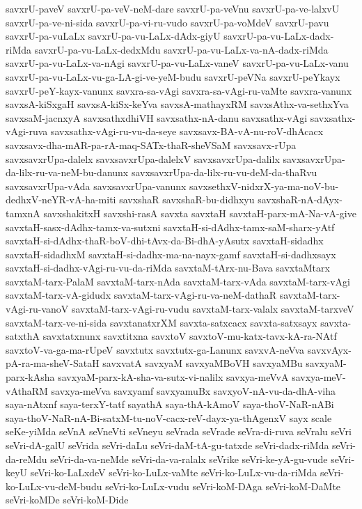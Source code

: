 {savxrU-paveV
savxrU-pa-veV-neM-dare
savxrU-pa-veVnu
savxrU-pa-ve-lalxvU
savxrU-pa-ve-ni-sida
savxrU-pa-vi-ru-vudo
savxrU-pa-voMdeV
savxrU-pavu
savxrU-pa-vuLaLx
savxrU-pa-vu-LaLx-dAdx-giyU
savxrU-pa-vu-LaLx-dadx-riMda
savxrU-pa-vu-LaLx-dedxMdu
savxrU-pa-vu-LaLx-va-nA-dadx-riMda
savxrU-pa-vu-LaLx-va-nAgi
savxrU-pa-vu-LaLx-vaneV
savxrU-pa-vu-LaLx-vanu
savxrU-pa-vu-LaLx-vu-ga-LA-gi-ve-yeM-budu
savxrU-peVNa
savxrU-peYkayx
savxrU-peY-kayx-vanunx
savxra-sa-vAgi
savxra-sa-vAgi-ru-vaMte
savxra-vanunx
savxsA-kiSxgaH
savxsA-kiSx-keYva
savxsA-mathayxRM
savxsAthx-va-sethxYva
savxsaM-jacnxyA
savxsathxdhiVH
savxsathx-nA-danu
savxsathx-vAgi
savxsathx-vAgi-ruva
savxsathx-vAgi-ru-vu-da-seye
savxsavx-BA-vA-nu-roV-dhAcacx
savxsavx-dha-mAR-pa-rA-maq-SATx-thaR-sheVSaM
savxsavx-rUpa
savxsavxrUpa-dalelx
savxsavxrUpa-dalelxV
savxsavxrUpa-dalilx
savxsavxrUpa-da-lilx-ru-va-neM-bu-danunx
savxsavxrUpa-da-lilx-ru-vu-deM-da-thaRvu
savxsavxrUpa-vAda
savxsavxrUpa-vanunx
savxsethxV-nidxrX-ya-ma-noV-bu-dedhxV-neYR-vA-ha-miti
savxshaR
savxshaR-bu-didhxyu
savxshaR-nA-dAyx-tamxnA
savxshakitxH
savxshi-rasA
savxta
savxtaH
savxtaH-parx-mA-Na-vA-give
savxtaH-sasx-dAdhx-tamx-va-sutxni
savxtaH-si-dAdhx-tamx-saM-sharx-yAtf
savxtaH-si-dAdhx-thaR-boV-dhi-tAvx-da-Bi-dhA-yAsutx
savxtaH-sidadhx
savxtaH-sidadhxM
savxtaH-si-dadhx-ma-na-nayx-gamf
savxtaH-si-dadhxsayx
savxtaH-si-dadhx-vAgi-ru-vu-da-riMda
savxtaM-tArx-nu-Bava
savxtaMtarx
savxtaM-tarx-PalaM
savxtaM-tarx-nAda
savxtaM-tarx-vAda
savxtaM-tarx-vAgi
savxtaM-tarx-vA-gidudx
savxtaM-tarx-vAgi-ru-va-neM-dathaR
savxtaM-tarx-vAgi-ru-vanoV
savxtaM-tarx-vAgi-ru-vudu
savxtaM-tarx-valalx
savxtaM-tarxveV
savxtaM-tarx-ve-ni-sida
savxtanatxrXM
savxta-satxcacx
savxta-satxsayx
savxta-satxthA
savxtatxnunx
savxtitxna
savxtoV
savxtoV-mu-katx-tavx-kA-ra-NAtf
savxtoV-va-ga-ma-rUpeV
savxtutx
savxtutx-ga-Lanunx
savxvA-neVva
savxvAyx-pA-ra-ma-sheV-SataH
savxvatA
savxyaM
savxyaMBoVH
savxyaMBu
savxyaM-parx-kAsha
savxyaM-parx-kA-sha-va-sutx-vi-nalilx
savxya-meVvA
savxya-meV-vAthaRM
savxya-meVva
savxyamf
savxyamuBx
savxyoV-nA-vu-da-dhA-viha
saya-nAtxnf
saya-terxY-tatf
sayathA
saya-thA-kAmoV
saya-thoV-NaR-nABi
saya-thoV-NaR-nA-Bi-satxM-tu-noV-cacx-reV-dayx-ya-thAgenxV
sayx
scale
seKe-yiMda
seVnA
seVneVti
seVneyu
seVrada
seVrade
seVra-di-ruva
seVralu
seVri
seVri-dA-galU
seVrida
seVri-daLu
seVri-daM-tA-gu-tatxde
seVri-dadx-riMda
seVri-da-reMdu
seVri-da-va-neMde
seVri-da-va-ralalx
seVrike
seVri-ke-yA-gu-vude
seVri-keyU
seVri-ko-LaLxdeV
seVri-ko-LuLx-vaMte
seVri-ko-LuLx-vu-da-riMda
seVri-ko-LuLx-vu-deM-budu
seVri-ko-LuLx-vudu
seVri-koM-DAga
seVri-koM-DaMte
seVri-koMDe
seVri-koM-Dide
}
